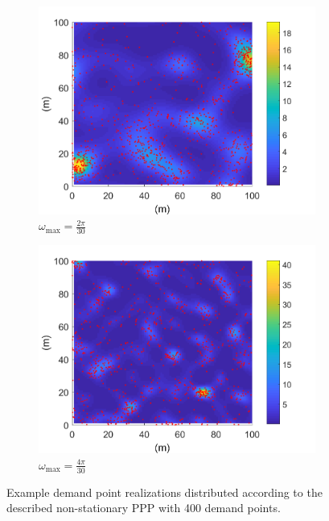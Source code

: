 \documentclass[12pt,dvipsnames]{report}
\begin{document}
\begin{figure}[!ht]
\centering
\begin{subfigure}{.45\textwidth}
	\centering
	\includegraphics[width=1\linewidth]{rho_nsPPP-400_O2pi-300_L100000_X100_Y100}
	\caption{\small $\omega_{\max}=\frac{2\pi}{30}$}
	\label{fig:rho_nsPPP_2pi-300}
\end{subfigure}
\hspace{0.5cm}
\begin{subfigure}{.45\textwidth}
	\centering
	\includegraphics[width=1\linewidth]{rho_nsPPP-400_O4pi-300_L100000_X100_Y100}
	\caption{\small $\omega_{\max}=\frac{4\pi}{30}$}
	\label{fig:rho_nsPPP_4pi-300}
\end{subfigure}
\caption[Realizations of example SSLT demand point distributions]{\small Example demand point realizations distributed according to the described non-stationary PPP with 400 demand points.}
\label{fig:rho_nsPPP}
\end{figure}
\end{document}
